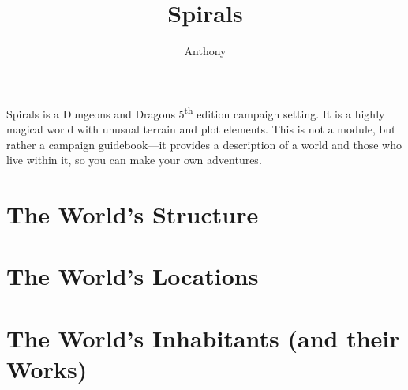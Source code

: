 \documentclass[a4paper]{book}
\title{Spirals}
\author{Anthony \censor{Super}}
\begin{document}
\setcounter{tocdepth}{1}
\maketitle



Spirals is a Dungeons and Dragons 5\textsuperscript{th} edition campaign setting.
It is a highly magical world with unusual terrain and plot elements.
This is not a module, but rather a campaign guidebook---it provides a description of a world and those who live within it, so you can make your own adventures.
\listoftodos
\tableofcontents 

\part{The World's Structure}



\part{The World's Locations}




\part{The World's Inhabitants (and their Works)}



\end{document}
